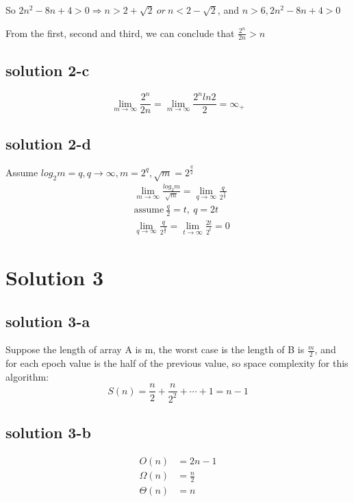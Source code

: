 \documentclass{article}
\begin{document}
So $2n^2-8n+4 > 0 \Rightarrow n > 2 + \sqrt{2} \ or \ n < 2 - \sqrt{2}$, and $n>6, 2n^2 - 8n +4 > 0$

From the first, second and third, we can conclude that $\frac{2^n}{2n} > n$

\subsection{solution 2-c}
\begin{equation}
    \lim_{m \to \infty}\frac{2^n}{2n} = \lim_{m \to \infty}\frac{2^nln2}{2} = \infty_{+}
\end{equation}

\subsection{solution 2-d}
Assume $log_2m = q, q \rightarrow \infty, m = 2^q, \sqrt{m} = 2^{\frac{q}{2}}$
\begin{equation}
    \begin{aligned}
        &\lim_{m \to \infty} \frac{log_2m}{\sqrt{m}} = \lim_{q \to \infty}\frac{q}{2^{\frac{q}{2}}}\\
        &\mbox{assume}\ \frac{q}{2} = t,\ q = 2t\\
        &\lim_{q \to \infty}\frac{q}{2^{\frac{q}{2}}} = \lim_{t \to \infty} \frac{2t}{2^{t}} = 0
    \end{aligned}
\end{equation}

\section{Solution 3}
\subsection{solution 3-a}
Suppose the length of array A is m, the worst case is the length of B is $\frac{m}{2}$, and for each epoch value is the half of the previous value, 
so space complexity for this algorithm:
\begin{equation}
    S(n) = \frac{n}{2} +  \frac{n}{2^2} + \cdots + 1 = n -1 
\end{equation}

\subsection{solution 3-b}
\begin{equation}
    \begin{aligned}
        O(n) &= 2n- 1\\
        \Omega(n) &= \frac{n}{2}\\
        \Theta(n) &= n
    \end{aligned}
\end{equation}
\end{document}
